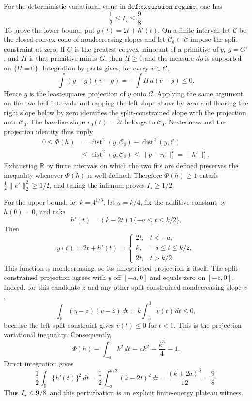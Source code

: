 For the deterministic variational value in \(\texttt{def:excursion-regime}\), one has
\[
 \frac12\le I_\star\le\frac98.
\]
To prove the lower bound, put \(y(t)=2t+h'(t)\).  On a finite interval, let \(\mathcal C\) be the closed convex cone of nondecreasing slopes and let \(\mathcal C_0\subset\mathcal C\) impose the split constraint at zero.  If \(G\) is the greatest convex minorant of a primitive of \(y\), \(g=G'\), and \(H\) is that primitive minus \(G\), then \(H\ge0\) and the measure \(dg\) is supported on \(\{H=0\}\).  Integration by parts gives, for every \(v\in\mathcal C\),
\[
 \int (y-g)(v-g)
 =-\int H\,d(v-g)\le0.
\]
Hence \(g\) is the least-squares projection of \(y\) onto \(\mathcal C\).  Applying the same argument on the two half-intervals and capping the left slope above by zero and flooring the right slope below by zero identifies the split-constrained slope with the projection onto \(\mathcal C_0\).  The baseline slope \(r_0(t)=2t\) belongs to \(\mathcal C_0\).  Nestedness and the projection identity thus imply
\[
 \begin{aligned}
 0\le\Phi(h)
 &=\operatorname{dist}^2(y,\mathcal C_0)
   -\operatorname{dist}^2(y,\mathcal C)\\
 &\le \operatorname{dist}^2(y,\mathcal C_0)
 \le \lVert y-r_0\rVert_2^2
 =\lVert h'\rVert_2^2.
 \end{aligned}
\]
Exhausting \(\mathbb R\) by finite intervals on which the two fits are defined preserves the inequality whenever \(\Phi(h)\) is well defined.  Therefore \(\Phi(h)\ge1\) entails \(\frac12\lVert h'\rVert_2^2\ge1/2\), and taking the infimum proves \(I_\star\ge1/2\).

For the upper bound, let \(k=4^{1/3}\), let \(a=k/4\), fix the additive constant by \(h(0)=0\), and take
\[
 h'(t)=(k-2t)\mathbf 1\{-a\le t\le k/2\}.
\]
Then
\[
 y(t)=2t+h'(t)=
 \begin{cases}
 2t,&t<-a,\\
 k,&-a\le t\le k/2,\\
 2t,&t>k/2.
 \end{cases}
\]
This function is nondecreasing, so its unrestricted projection is itself.  The split-constrained projection agrees with \(y\) off \([-a,0]\) and equals zero on \([-a,0]\).  Indeed, for this candidate \(z\) and any other split-constrained nondecreasing slope \(v\),
\[
 \int_{\mathbb R}(y-z)(v-z)\,dt
 =k\int_{-a}^{0}v(t)\,dt\le0,
\]
because the left split constraint gives \(v(t)\le0\) for \(t<0\).  This is the projection variational inequality.  Consequently,
\[
 \Phi(h)=\int_{-a}^{0}k^2\,dt=ak^2=\frac{k^3}{4}=1.
\]
Direct integration gives
\[
 \frac12\int_{\mathbb R}\{h'(t)\}^2\,dt
 =\frac12\int_{-a}^{k/2}(k-2t)^2\,dt
 =\frac{(k+2a)^3}{12}
 =\frac98.
\]
Thus \(I_\star\le9/8\), and this perturbation is an explicit finite-energy plateau witness.


